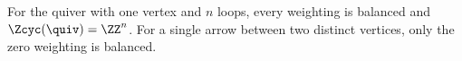 \begin{example}\label{sh-0005}
For the quiver with one vertex and $n$ loops, every weighting is balanced and $\Zcyc(\quiv) = \ZZ^{n}$. For a single arrow between two distinct vertices, only the zero weighting is balanced.
\end{example}
